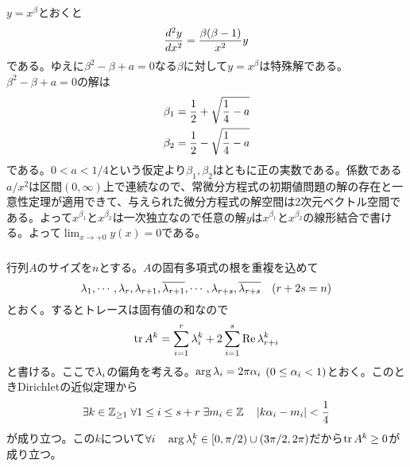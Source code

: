 \subsubsection{}%
\begin{sol}
$y = x^{\beta}$とおくと
\[
\frac{d^2 y}{dx^2} = \frac{\beta (\beta -1)}{x^2} y
\]
である。ゆえに$\beta^2 - \beta + a = 0$なる$\beta$に対して$y = x^{\beta}$は特殊解である。$\beta^2 - \beta + a = 0$の解は
\begin{align*}
  \beta_1 &= \frac{1}{2} + \sqrt{ \frac{1}{4} - a} \\
  \beta_2 &= \frac{1}{2} - \sqrt{ \frac{1}{4} - a}
\end{align*}
である。$0 < a< 1/4$という仮定より$\beta_1, \beta_2$はともに正の実数である。係数である$a/x^2$は区間$(0,\infty)$上で連続なので、常微分方程式の初期値問題の解の存在と一意性定理が適用できて、与えられた微分方程式の解空間は$2$次元ベクトル空間である。よって$x^{\beta_1}$と$x^{\beta_2}$は一次独立なので任意の解$y$は$x^{\beta_1}$と$x^{\beta_2}$の線形結合で書ける。よって$\lim_{x \to + 0} y(x)=0$である。

\end{sol}


\newpage

\subsubsection{} %
\begin{sol}
  行列$A$のサイズを$n$とする。$A$の固有多項式の根を重複を込めて
  \[
  {\lambda}_1, \cdots , {\lambda}_r, {\lambda}_{r+1}, \overline{{\lambda}_{r+1}}, \cdots , {\lambda}_{r+s}, \overline{{\lambda}_{r+s}} \quad (r+2s = n)
  \]
  とおく。するとトレースは固有値の和なので
  \[
  \operatorname{tr} A^k = \sum_{i=1}^r {\lambda}_i^k + 2  \sum_{i=1}^s \operatorname{Re} {\lambda}_{r+i}^k
  \]
  と書ける。ここで${\lambda}_i$の偏角を考える。$\arg {\lambda}_i = 2\pi {\alpha}_i$ $(0 \leq {\alpha}_i < 1)$とおく。このときDirichletの近似定理から
  \[
  \exists k \in {\mathbb Z}_{\geq 1} \; \forall 1 \leq i \leq s+r \; \exists m_i \in {\mathbb Z} \quad \left \lvert k{\alpha}_i - m_i \right \rvert < \frac{1}{4}
  \]
  が成り立つ。この$k$について$\forall i \quad \arg {\lambda}_i^k \in [0, \pi/2) \cup (3\pi / 2, 2\pi)$だから$\operatorname{tr} A^k \geq 0$が成り立つ。
\end{sol}
